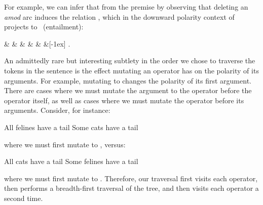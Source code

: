 For example, we can infer that 
   from the premise
   by observing that deleting
  an \textit{amod} arc induces the relation \reverse, which in the downward
  polarity context of \textit{} projects to \forward\ (entailment):

\begin{center}
\begin{dependency}[text only label, label style={above}]
  \begin{deptext}[column sep=-0.00cm]
     \&  \&  \& 
       \&  \&  \&[-1ex] .\\
  \end{deptext}
\end{dependency}
\end{center}
\vspace{-2mm}


An admittedly rare but interesting subtlety in the order
  we chose to traverse the tokens in the sentence
  is the effect mutating an operator has on the
  polarity of its arguments.
For example, mutating  to 
  changes the polarity of its first argument.
There are cases where we must mutate the argument to the operator before
  the operator itself, as well as cases where we must mutate the operator
  before its arguments.
Consider, for instance:

\entailmentExample
{All felines have a tail}
{Some cats have a tail}

\noindent where we must first mutate  to , versus:

\entailmentExample
{All cats have a tail}
{Some felines have a tail}

\noindent where we must first mutate  to .
Therefore, our traversal first visits each operator, then performs a breadth-first
  traversal of the tree, and then visits each operator a second time.

